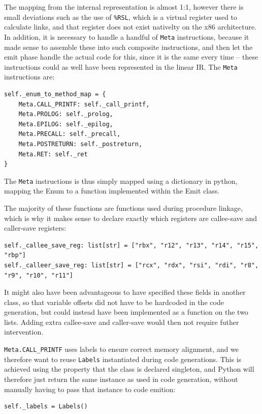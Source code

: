 The mapping from the internal representation is almost 1:1, however there is small deviations such as the use of \texttt{\%RSL}, which is a virtual register used to calculate links, and that register does not exist nativelty on the x86 architecture. In addition, it is necessary to handle a handful of \texttt{Meta} instructions, because it made sense to assemble these into such composite instructions, and then let the emit phase handle the actual code for this, since it is the same every time -- these instructions could as well have been represented in the linear IR. The \texttt{Meta} instructions are:

\begin{verbatim}
self._enum_to_method_map = {
    Meta.CALL_PRINTF: self._call_printf,
    Meta.PROLOG: self._prolog,
    Meta.EPILOG: self._epilog,
    Meta.PRECALL: self._precall,
    Meta.POSTRETURN: self._postreturn,
    Meta.RET: self._ret
}
\end{verbatim}

The \texttt{Meta} instructions is thus simply mapped using a dictionary in python, mapping the Enum to a function implemented within the Emit class.

The majority of these functions are functions used during procedure linkage, which is why it makes sense to declare exactly which registers are callee-save and caller-save registers:

\begin{verbatim}
self._callee_save_reg: list[str] = ["rbx", "r12", "r13", "r14", "r15", "rbp"]
self._calleer_save_reg: list[str] = ["rcx", "rdx", "rsi", "rdi", "r8", "r9", "r10", "r11"]
\end{verbatim}

It might also have been advantageous to have specified these fields in another class, so that variable offsets did not have to be hardcoded in the code generation, but could instead have been implemented as a function on the two lists. Adding extra callee-save and caller-save would then not require futher intervention.

\texttt{Meta.CALL\_PRINTF} uses labels to ensure correct memory alignment, and we therefore want to reuse \texttt{Labels} instantiated during code generations. This is achieved using the property that the class is declared singleton, and Python will therefore just return the same instance as used in code generation, without manually having to pass that instance to code emition:

\begin{verbatim}
self._labels = Labels()
\end{verbatim}

